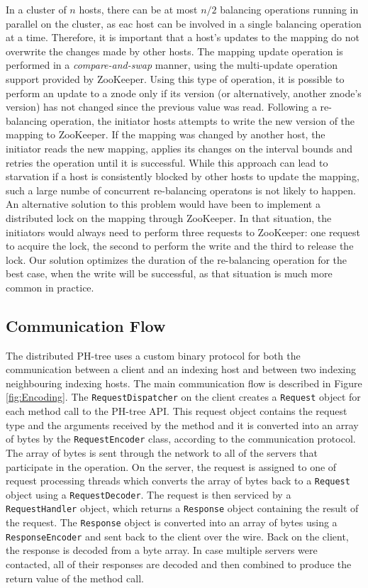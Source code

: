 \documentclass[11pt,a4paper]{globis-book}
\begin{document}
In a cluster of $n$ hosts, there can be at most $n/2$ balancing operations running in parallel on the cluster, as eac host can be involved in a single balancing operation at a time. Therefore, it is important that a host's updates to the mapping do not overwrite the changes made by other hosts. The mapping update operation is performed in a \textit{compare-and-swap} manner, using the multi-update operation support provided by ZooKeeper. Using this type of operation, it is possible to perform an update to a znode only if its version (or alternatively, another znode's version) has not changed since the previous value was read. Following a re-balancing operation, the initiator hosts attempts to write the new version of the mapping to ZooKeeper. If the mapping was changed by another host, the initiator reads the new mapping, applies its changes on the interval bounds and retries the operation until it is successful. While this approach can lead to starvation if a host is consistently blocked by other hosts to update the mapping, such a large numbe of concurrent re-balancing operatons is not likely to happen. An alternative solution to this problem would have been to implement a distributed lock on the mapping through ZooKeeper. In that situation, the initiators would always need to perform three requests to ZooKeeper: one request to acquire the lock, the second to perform the write and the third to release the lock. Our solution optimizes the duration of the re-balancing operation for the best case, when the write will be successful, as that situation is much more common in practice. 

\subsection{Communication Flow}

The distributed PH-tree uses a custom binary protocol for both the communication between a client and an indexing host and between two indexing neighbouring indexing hosts. The main communication flow is described in Figure \ref{fig:Encoding}. The \texttt{RequestDispatcher} on the client creates a \texttt{Request} object for each method call to the PH-tree API. This request object contains the request type and the arguments received by the method and it is converted into an array of bytes by the \texttt{RequestEncoder} class, according to the communication protocol. The array of bytes is sent through the network to all of the servers that participate in the operation. On the server, the request is assigned to one of request processing threads which converts the array of bytes back to a \texttt{Request} object using a \texttt{RequestDecoder}. The request is then serviced by a \texttt{RequestHandler} object, which returns a \texttt{Response} object containing the result of the request. The \texttt{Response} object is converted into an array of bytes using a \texttt{ResponseEncoder} and sent back to the client over the wire. Back on the client, the response is decoded from a byte array. In case multiple servers were contacted, all of their responses are decoded and then combined to produce the return value of the method call.
\end{document}
